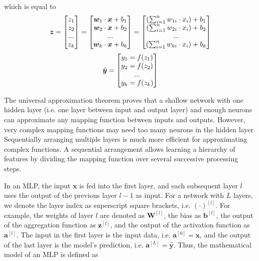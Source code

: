 %
which is equal to
%
\begin{align}\eqlbl{nn4}%
		\boldsymbol{z} = \begin{bmatrix}
			z_1\\
			z_2\\
			...\\
			z_k\\
		\end{bmatrix} = \begin{bmatrix}
			\boldsymbol{w}_1 \cdot \boldsymbol{x} + b_1\\
			\boldsymbol{w}_2 \cdot \boldsymbol{x} + b_2\\
			...\\
			\boldsymbol{w}_k \cdot \boldsymbol{x} + b_k\\
		\end{bmatrix} = \begin{bmatrix}
			\left( \sum_{i=1}^{n}w_{1i} \cdot x_i \right) + b_1\\
			\left( \sum_{i=1}^{n}w_{2i} \cdot x_i \right) + b_2\\
			...\\
			\left( \sum_{i=1}^{n}w_{ki} \cdot x_i \right) + b_k\\
		\end{bmatrix}
\end{align}
\begin{align}\eqlbl{nn5}%
		\hat{\boldsymbol{y}} = \begin{bmatrix}
			y_1 = f(z_1)\\
			y_2 = f(z_2)\\
			...\\
			y_k = f(z_k)\\
		\end{bmatrix}
\end{align}
%

The universal approximation theorem proves that a shallow network with one hidden layer (i.e. one layer between input and output layer) and enough neurons can approximate any mapping function between inputs and outputs.
However, very complex mapping functions may need too many neurons in the hidden layer.
Sequentially arranging multiple layers is much more efficient for approximating complex functions.
A sequential arrangement allows learning a hierarchy of features by dividing the mapping function over several successive processing steps.

In an MLP, the input \(\boldsymbol{x}\) is fed into the first layer, and each subsequent layer \(l\) uses the output of the previous layer \(l-1\) as input.
For a network with \(L\) layers, we denote the layer index as superscript square brackets, i.e. $(\cdot)^{[l]}$.
For example, the weights of layer $l$ are denoted as $\boldsymbol{W}^{[l]}$, the bias as \(\boldsymbol{b}^{[l]}\), the output of the aggregation function as \(\boldsymbol{z}^{[l]}\), and the output of the activation function as \(\boldsymbol{a}^{[l]}\).
The input in the first layer is the input data, i.e. $\boldsymbol{a}^{[0]} = \boldsymbol{x}$, and the output of the last layer is the model's prediction, i.e. $\boldsymbol{a}^{[L]} = \hat{\boldsymbol{y}}$. Thus, the mathematical model of an MLP is defined as


